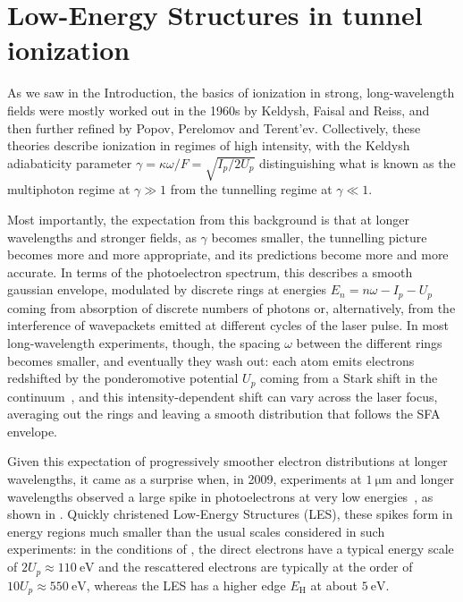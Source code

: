 \section{Low-Energy Structures in tunnel ionization}
\label{sec:LES-review}
As we saw in the Introduction, the basics of ionization in strong, long-wavelength fields were mostly worked out in the 1960s by Keldysh, Faisal and Reiss, and then further refined by Popov, Perelomov and Terent'ev. Collectively, these theories describe ionization in regimes of high intensity, with the Keldysh adiabaticity parameter $\gamma=\kappa \omega /F = \sqrt{I_p/2U_p}$ distinguishing what is known as the multiphoton regime at $\gamma \gg 1$ from the tunnelling regime at $\gamma \ll 1$.

Most importantly, the expectation from this background is that at longer wavelengths and stronger fields, as $\gamma$ becomes smaller, the tunnelling picture becomes more and more appropriate, and its predictions become more and more accurate. In terms of the photoelectron spectrum, this describes a smooth gaussian envelope, modulated by discrete rings at energies $E_n=n\omega -I_p - U_p$ coming from absorption of discrete numbers of photons or, alternatively, from the interference of wavepackets emitted at different cycles of the laser pulse. In most long-wavelength experiments, though, the spacing $\omega$ between the different rings becomes smaller, and eventually they wash out: each atom emits electrons redshifted by the ponderomotive potential $U_p$ coming from a Stark shift in the continuum~\cite{muller_ponderomotive-shift_1983}, and this intensity-dependent shift can vary across the laser focus, averaging out the rings and leaving a smooth distribution that follows the SFA envelope.

Given this expectation of progressively smoother electron distributions at longer wavelengths, it came as a surprise when, in 2009, experiments at $\SI{1}{\micro\meter}$ and longer wavelengths observed a large spike in photoelectrons at very low energies~\cite{blaga_original_LES, faisal_ionization_surprise}, as shown in . Quickly christened Low-Energy Structures (LES), these spikes form in energy regions much smaller than the usual scales considered in such experiments: in the conditions of , the direct electrons have a typical energy scale of $2U_p\approx\SI{110}{\electronvolt}$ and the rescattered electrons are typically at the order of $10U_p\approx\SI{550}{\electronvolt}$, whereas the LES has a higher edge $E_\mathrm{H}$ at about $\SI{5}{\electronvolt}$. 

